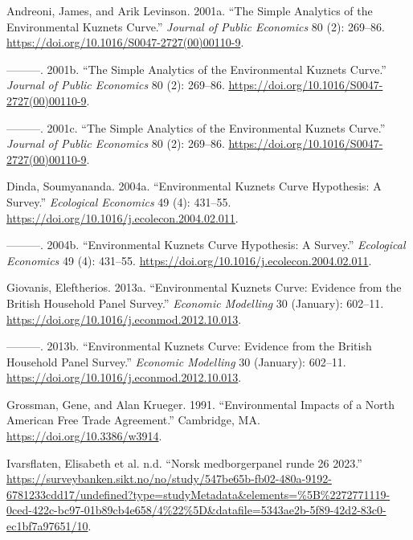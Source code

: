 \documentclass[
  12pt,
  letterpaper,
  DIV=11,
  numbers=noendperiod]{scrartcl}
\newlength{\cslhangindent}
\newlength{\cslentryspacingunit} %
\newenvironment{CSLReferences}[2] %
 {%
  \setlength{\parindent}{0pt}
  \ifodd #1
  \let\oldpar\par
  \def\par{\hangindent=\cslhangindent\oldpar}
  \fi
  \setlength{\parskip}{#2\cslentryspacingunit}
 }%
 {}
\begin{document}
\hypertarget{refs}{}
\begin{CSLReferences}{1}{0}
\leavevmode{}%
Andreoni, James, and Arik Levinson. 2001a. {``The Simple Analytics of
the Environmental Kuznets Curve.''} \emph{Journal of Public Economics}
80 (2): 269--86. \url{https://doi.org/10.1016/S0047-2727(00)00110-9}.

\leavevmode{}%
---------. 2001b. {``The Simple Analytics of the Environmental Kuznets
Curve.''} \emph{Journal of Public Economics} 80 (2): 269--86.
\url{https://doi.org/10.1016/S0047-2727(00)00110-9}.

\leavevmode{}%
---------. 2001c. {``The Simple Analytics of the Environmental Kuznets
Curve.''} \emph{Journal of Public Economics} 80 (2): 269--86.
\url{https://doi.org/10.1016/S0047-2727(00)00110-9}.

\leavevmode{}%
Dinda, Soumyananda. 2004a. {``Environmental Kuznets Curve Hypothesis: A
Survey.''} \emph{Ecological Economics} 49 (4): 431--55.
\url{https://doi.org/10.1016/j.ecolecon.2004.02.011}.

\leavevmode{}%
---------. 2004b. {``Environmental Kuznets Curve Hypothesis: A
Survey.''} \emph{Ecological Economics} 49 (4): 431--55.
\url{https://doi.org/10.1016/j.ecolecon.2004.02.011}.

\leavevmode{}%
Giovanis, Eleftherios. 2013a. {``Environmental Kuznets Curve: Evidence
from the British Household Panel Survey.''} \emph{Economic Modelling} 30
(January): 602--11. \url{https://doi.org/10.1016/j.econmod.2012.10.013}.

\leavevmode{}%
---------. 2013b. {``Environmental Kuznets Curve: Evidence from the
British Household Panel Survey.''} \emph{Economic Modelling} 30
(January): 602--11. \url{https://doi.org/10.1016/j.econmod.2012.10.013}.

\leavevmode{}%
Grossman, Gene, and Alan Krueger. 1991. {``Environmental Impacts of a
North American Free Trade Agreement.''} Cambridge, MA.
\url{https://doi.org/10.3386/w3914}.

\leavevmode{}%
Ivarsflaten, Elisabeth et al. n.d. {``Norsk medborgerpanel runde 26
2023.''}
\url{https://surveybanken.sikt.no/no/study/547be65b-fb02-480a-9192-6781233cdd17/undefined?type=studyMetadata\&elements=\%5B\%2272771119-0ced-422c-bc97-01b89cb4e658/4\%22\%5D\&datafile=5343ae2b-5f89-42d2-83c0-ec1bf7a97651/10}.


\end{CSLReferences}
\end{document}
